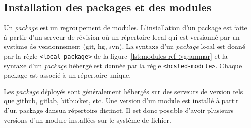 \subsection{Installation des packages et des modules}
%
Un \textit{package} est un regroupement de modules.  L'installation d'un
package est faite à partir d'un serveur de révision où un répertoire local qui
est versionné par un système de versionnement (git, hg, svn).  La syntaxe d'un
\textit{package} local est donné par la règle \texttt{<local-package>} de la
figure~\ref{lst:modules-ref->grammar} et la syntaxe d'un \textit{package}
hébergé est donnée par la règle \texttt{<hosted-module>}.  Chaque package est
associé à un répertoire unique.







Les \textit{package} déployés sont généralement hébergés sur des serveurs de
version tels que github, gitlab, bitbucket, etc. Une version d'un module est
installé à partir d'un package dansun répertoire distinct.
Il est donc possible d'avoir plusieurs versions d'un module installées
sur le système de fichier.

